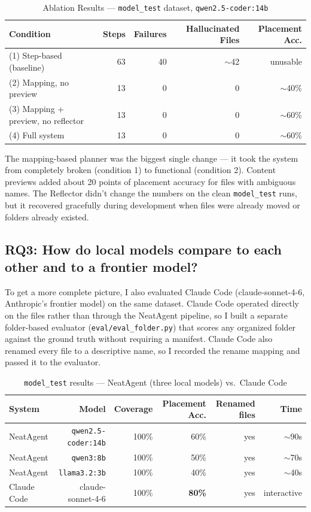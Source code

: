 \documentclass{article}
\begin{document}
\begin{table}[H]
\centering
\caption{Ablation Results — \texttt{model\_test} dataset, \texttt{qwen2.5-coder:14b}}
\begin{tabular}{lrrrr}
\toprule
\textbf{Condition} & \textbf{Steps} & \textbf{Failures} & \textbf{Hallucinated Files} & \textbf{Placement Acc.} \\
\midrule
(1) Step-based (baseline) & 63 & 40 & $\sim$42 & unusable \\
(2) Mapping, no preview   & 13 &  0 & 0        & $\sim$40\% \\
(3) Mapping + preview, no reflector & 13 & 0 & 0 & $\sim$60\% \\
(4) Full system           & 13 &  0 & 0        & $\sim$60\% \\
\bottomrule
\end{tabular}
\end{table}

The mapping-based planner was the biggest single change — it took the system from completely broken (condition 1) to functional (condition 2). Content previews added about 20 points of placement accuracy for files with ambiguous names. The Reflector didn't change the numbers on the clean \texttt{model\_test} runs, but it recovered gracefully during development when files were already moved or folders already existed.

\subsection{RQ3: How do local models compare to each other and to a frontier model?}

To get a more complete picture, I also evaluated Claude Code (claude-sonnet-4-6, Anthropic's frontier model) on the same dataset. Claude Code operated directly on the files rather than through the NeatAgent pipeline, so I built a separate folder-based evaluator (\texttt{eval/eval\_folder.py}) that scores any organized folder against the ground truth without requiring a manifest. Claude Code also renamed every file to a descriptive name, so I recorded the rename mapping and passed it to the evaluator.

\begin{table}[H]
\centering
\caption{\texttt{model\_test} results — NeatAgent (three local models) vs.\ Claude Code}
\begin{tabular}{lrrrrr}
\toprule
\textbf{System} & \textbf{Model} & \textbf{Coverage} & \textbf{Placement Acc.} & \textbf{Renamed files} & \textbf{Time} \\
\midrule
NeatAgent & \texttt{qwen2.5-coder:14b} & 100\% & 60\% & yes & $\sim$90s \\
NeatAgent & \texttt{qwen3:8b}          & 100\% & 50\% & yes & $\sim$70s \\
NeatAgent & \texttt{llama3.2:3b}       & 100\% & 40\% & yes & $\sim$40s \\
Claude Code & claude-sonnet-4-6        & 100\% & \textbf{80\%} & yes & interactive \\
\bottomrule
\end{tabular}
\end{table}
\end{document}
